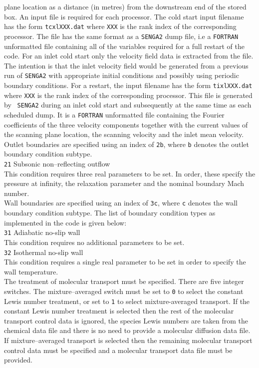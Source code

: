\documentclass[dvips]{article}
\begin{document}
plane location as a distance (in metres) from the downstream end of the
stored box.  An input file is required for each processor.  The cold
start input filename has the form {\tt tcxlXXX.dat} where {\tt XXX} is the  
rank index of the corresponding processor.  The file has the same format
as a {\tt SENGA2} dump file, i.e a {\tt FORTRAN} unformatted file containing
all of the variables required for a full restart of the code.  For an
inlet cold start only the velocity field data is extracted from the file.
The intention is that the inlet velocity field would be generated from a
previous run of {\tt SENGA2} with appropriate initial conditions and 
possibly using periodic boundary conditions.  For a restart, the input
filename has the form {\tt tixlXXX.dat} where {\tt XXX} is the rank
index of the corresponding processor.  This file is generated by {\tt
SENGA2} during an inlet cold start and subsequently at the same time
as each scheduled dump.  It is a {\tt FORTRAN}
unformatted file containing the Fourier coefficients of the three
velocity components together with the current values of the scanning
plane location, the scanning velocity and the inlet mean velocity.\\

\noindent
Outlet boundaries are specified using an index of {\tt 2b},
where {\tt b} denotes the outlet boundary condition subtype.\\[1mm]
{\tt 21} Subsonic non--reflecting outflow \\
This condition requires three real parameters to be set.  In order,
these specify the pressure at infinity, the relaxation parameter and the
nominal boundary Mach number.\\

\noindent
Wall boundaries are specified using an index of {\tt 3c},
where {\tt c} denotes the wall boundary condition subtype.  The 
list of boundary condition types as implemented in the code is given
below:\\[1mm]
{\tt 31} Adiabatic no-slip wall \\
This condition requires no additional parameters to be set.\\[1mm]
{\tt 32} Isothermal no-slip wall \\
This condition requires a single real parameter to be set in order to
specify the wall temperature.\\

\noindent
The treatment of molecular transport must be specified.  There are five integer
switches.  The mixture--averaged switch must be set to {\tt 0} to select the
constant Lewis number treatment, or set to {\tt 1} to select mixture-averaged
transport.  If the constant Lewis number treatment is selected then the rest of
the molecular transport control data is ignored, the species Lewis numbers are
taken from the chemical data file and there is no need to provide a molecular
diffusion data file.  If mixture--averaged transport is selected then the
remaining molecular transport control data must be specified and a
molecular transport data file must be provided.
\end{document}
